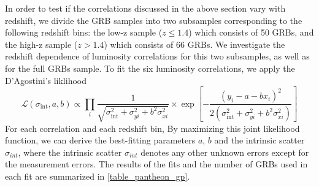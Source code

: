 In order to test if the correlations discussed in the above section vary with redshift, we divide the GRB samples into two subsamples corresponding to the following redshift bins: the low-z sample ($z \leq 1.4$) which consists of 50 GRBs, and the high-z sample ($z > 1.4$) which consists of 66 GRBs. We investigate the redshift dependence of luminosity correlations for this two subsamples, as well as for the full GRBs sample. To fit the six luminosity correlations, we apply the D’Agostini’s liklihood\cite{d2005fits}
$$
\mathcal{L}\left(\sigma_{\mathrm{int}}, a, b\right) \propto \prod_{i} \frac{1}{\sqrt{\sigma_{\mathrm{int}}^{2}+\sigma_{y i}^{2}+b^{2} \sigma_{x i}^{2}}} \times \exp \left[-\frac{\left(y_{i}-a-b x_{i}\right)^{2}}{2\left(\sigma_{\mathrm{int}}^{2}+\sigma_{y i}^{2}+b^{2} \sigma_{x i}^{2}\right)}\right]
$$
For each correlation and each redshift bin, By maximizing this joint likelihood function, we can derive the best-fitting parameters $a$, $b$ and the intrinsic scatter $\sigma_{int}$, where the intrinsic scatter $\sigma_{int}$ denotes any other unknown errors except for the measurement errors. The results of the fits and the number of GRBs used in each fit are summarized in \eqref{table_pantheon_gp}.
